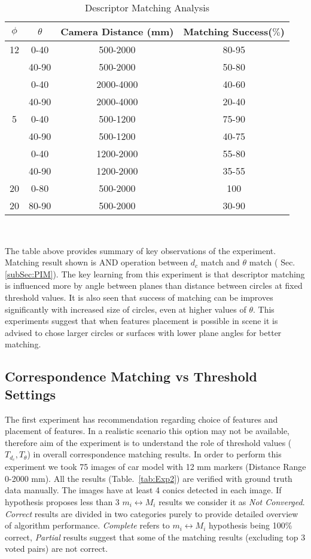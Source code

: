 \documentclass{bmvc2k}
\begin{document}
\begin{table}
\centering
\caption{Descriptor Matching Analysis } \label{table:MatchingSuccess}
\begin{tabular}{|c| c | c | c |}
\hline
$ \phi $ & $ \theta $ & Camera Distance (mm) & Matching Success($ \% $) \\ \hline
12 & 0-40 & 500-2000 & 80-95 \\
& 40-90 & 500-2000 & 50-80 \\
& 0-40 & 2000-4000 & 40-60 \\
& 40-90 & 2000-4000 & 20-40 \\ \hline
5 & 0-40 & 500-1200 & 75-90 \\
 & 40-90 & 500-1200 & 40-75 \\
 & 0-40 & 1200-2000 & 55-80 \\
 & 40-90 & 1200-2000 & 35-55\\ \hline
 20 & 0-80 & 500-2000 & 100 \\
 20 & 80-90 & 500-2000  & 30-90 \\ \hline 
\end{tabular} \\
\label{tab:Exp1}
\end{table}
The table above provides summary of key observations of the experiment. Matching result shown is AND operation between $ d_c $ match and $ \theta $ match ( Sec. \ref{subSec:PIM}). 
The key learning from this experiment is that descriptor matching is influenced more by angle between planes than distance between circles at fixed threshold values. It is also seen that success of matching can be improves significantly with increased size of circles, even at higher values of $ \theta $. This experiments suggest that when features placement is possible in scene it is advised to chose larger circles or surfaces with lower plane angles for better matching. 

\subsection{Correspondence Matching vs Threshold Settings}
The first experiment has recommendation regarding choice of features and placement of features. In a realistic scenario this option may not be available, therefore aim of the experiment is to understand the role of threshold values ($ T_{d_c}, T_\theta $) in overall correspondence matching results. In order to perform this experiment we took 75 images of car model with 12 mm markers (Distance Range 0-2000 mm). All the results (Table.~\ref{tab:Exp2}) are verified with ground truth data manually. 
The images have at least 4 conics detected in each image. If hypothesis proposes less than 3 $ m_i \leftrightarrow M_i $ results we consider it as \textit{Not Converged}. \textit{Correct} results are divided in two categories purely to provide detailed overview of algorithm performance. \textit{ Complete} refers to $ m_i \leftrightarrow M_i $ hypothesis being 100\% correct, \textit{Partial} results suggest that some of the matching results (excluding top 3 voted pairs) are not correct.  
\end{document}
